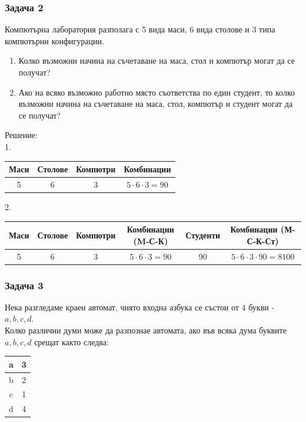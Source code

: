 \documentclass[fleqn, 12pt]{article}
\theoremstyle{definition}
\begin{document}
\subsubsection*{Задача 2}
Компютърна лаборатория разполага с 5 вида маси, 6 вида столове и 3 типа компютърни конфигурации. 
\begin{enumerate}
\item Колко възможни начина на съчетаване на маса, стол и компютър могат да се получат?
\item Ако на всяко възможно работно място съответства по един студент, то колко възможни начина на съчетаване на маса, стол, компютър и студент могат да се получат?
\end{enumerate}
Решение: \\
1.
\begin{center}
\begin{tabular}{|c|c|c|c|} 
\hline
Маси & Столове & Компютри & Комбинации \\
\hline
5 & 6 & 3 & $5 \cdot 6 \cdot 3 = 90$\\
\hline
\end{tabular}
\end{center}
2.
\begin{center}
\begin{tabular}{|c|c|c|c|c|c|} 
\hline
Маси & Столове & Компютри & Комбинации (M-С-К) & Студенти & Комбинации (М-С-К-Ст) \\
\hline
5 & 6 & 3 & $5 \cdot 6 \cdot 3 = 90$ & 90 & $5 \cdot 6 \cdot 3 \cdot 90 = 8100$ \\
\hline 
\end{tabular}
\end{center}

\subsubsection*{Задача 3}
Нека разгледаме краен автомат, чиято входна азбука се състои от 4 букви - $a,b,c,d$. \\
Колко различни думи може да разпознае автомата, ако във всяка дума буквите $a,b,c,d$ срещат както следва:
\begin{center}
\begin{tabular}{|c|c|} 
\hline
a & 3 \\
\hline
b & 2 \\
\hline
c & 1 \\
\hline
d & 4\\
\hline
\end{tabular}
\end{center}
\end{document}
